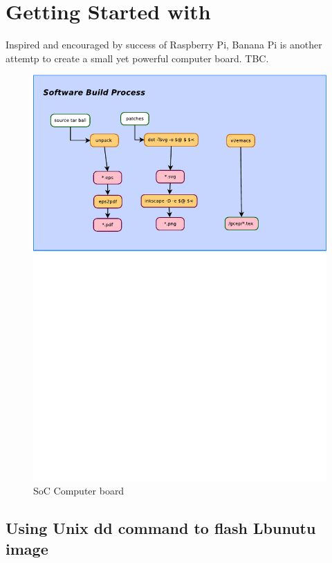 \section{Getting Started with }

Inspired and encouraged by success of Raspberry Pi, Banana Pi is another attemtp to create a small yet powerful computer board. TBC.

\begin{figure}[H]
\caption{SoC Computer board}
\label{fig:SoC computers}
\begin{center}
\includegraphics[scale=0.65]{dia/sbutils.pdf}
\end{center}
\end{figure}

\subsection{Using Unix dd command to flash Lbunutu image}

